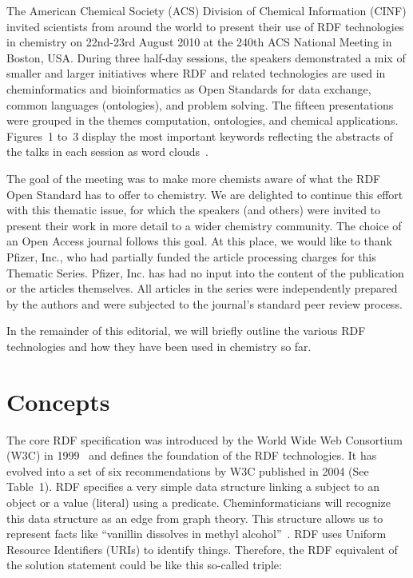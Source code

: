 \documentclass[10pt]{bmc_article}
\newenvironment{bmcformat}{\begin{raggedright}\baselineskip20pt\sloppy\setboolean{publ}{false}}{\end{raggedright}\baselineskip20pt\sloppy}
\begin{document}
\begin{bmcformat}
The American Chemical Society (ACS) Division of Chemical Information (CINF)
invited scientists from around the world to present their use of RDF
technologies in chemistry on 22nd-23rd August 2010
at the 240th ACS National Meeting in Boston, USA. During three half-day
sessions, the speakers demonstrated a mix of smaller and larger initiatives
where RDF and related technologies are used in cheminformatics and
bioinformatics as Open Standards for data exchange, common languages
(ontologies), and problem solving. The fifteen presentations were grouped in the themes computation,
ontologies, and chemical applications. Figures~1 to~3 display the most important
keywords reflecting the abstracts of the talks in each session as word
clouds~\cite{WORDLE}.

The goal of the meeting was to make more chemists aware of what the RDF Open
Standard has to offer to chemistry. We are delighted to continue this effort
with this thematic issue, for which the speakers (and others) were invited
to present their work in more detail to a wider chemistry community. The choice
of an Open Access journal follows this goal. At this place, we would like to thank Pfizer, Inc., 
who had partially funded the article processing charges for this Thematic Series.
Pfizer, Inc. has had no input into the content of the publication or the articles themselves.
All articles in the series were independently prepared by the authors and
were subjected to the journal's standard peer review process.

In the remainder of this editorial, we will briefly outline the various RDF
technologies and how they have been used in chemistry so far.

\section{Concepts}

The core RDF specification was introduced by the World Wide Web Consortium (W3C)
in 1999~\cite{Lassila1999} and defines the foundation of the RDF technologies. It has
evolved into a set of six recommendations by W3C published in 2004
(See Table~1). 
RDF specifies a very simple data structure linking a subject to an object or a
value (literal) using a predicate. Cheminformaticians will recognize this data
structure as an edge from graph theory. This structure allows us to represent
facts like ``vanillin dissolves in methyl alcohol''~\cite{ONS2010}. RDF uses Uniform
Resource Identifiers (URIs) to identify things. Therefore, the RDF equivalent of
the solution statement could be like this so-called triple:


\end{bmcformat}
\end{document}
